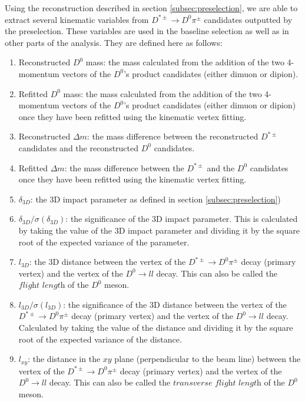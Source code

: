 Using the reconstruction described in section \ref{subsec:preselection}, we are able to extract several kinematic variables from $D^{*\pm} \to D^0 \pi^\pm$ candidates outputted by the preselection. These variables are used in the baseline selection as well as in other parts of the analysis. They are defined here as follows:
\begin{enumerate}
    \item Reconstructed $D^0$ mass: the mass calculated from the addition of the two 4-momentum vectors of the $D^0$'s product candidates (either dimuon or dipion). 
    \item Refitted $D^0$ mass: the mass calculated from the addition of the two 4-momentum vectors of the $D^0$'s product candidates (either dimuon or dipion) once they have been refitted using the kinematic vertex fitting. 
    \item Reconstructed $\Delta m$: the mass difference between the reconstructed $D^{*\pm}$ candidates and the reconstructed $D^0$ candidates. 
    \item Refitted $\Delta m$: the mass difference between the $D^{*\pm}$ and the $D^0$ candidates once they have been refitted using the kinematic vertex fitting.
    \item $\delta_{3D}$: the 3D impact parameter as defined in section \ref{subsec:preselection})
    \item $\delta_{3D}/\sigma\left(\delta_{3D}\right)$: the significance of the 3D impact parameter. This is calculated by taking the value of the 3D impact parameter and dividing it by the square root of the expected variance of the parameter. 
    \item $l_{3D}$: the 3D distance between the vertex of the $D^{*\pm} \to D^0 \pi^\pm$ decay (primary vertex) and the vertex of the $D^0 \to l l$ decay. This can also be called the $\textit{flight length}$ of the $D^0$ meson. 
    \item $l_{3D}/\sigma\left(l_{3D}\right)$: the significance of the 3D distance between the vertex of the $D^{*\pm} \to D^0 \pi^\pm$ decay (primary vertex) and the vertex of the $D^0 \to l l$ decay. Calculated by taking the value of the distance and dividing it by the square root of the expected variance of the distance. 
    \item $l_{xy}$: the distance in the $xy$ plane (perpendicular to the beam line) between the vertex of the $D^{*\pm} \to D^0 \pi^\pm$ decay (primary vertex) and the vertex of the $D^0 \to l l$ decay.  This can also be called the $\textit{transverse flight length}$ of the $D^0$ meson. 

\end{enumerate}
